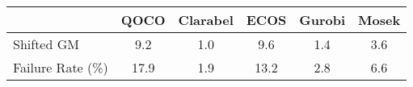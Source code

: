 \begin{tabular}{lccccc}
  \hline
   & \textbf{QOCO} & \textbf{Clarabel} & \textbf{ECOS} & \textbf{Gurobi} & \textbf{Mosek} \\ \hline
  Shifted GM & 9.2 & 1.0 & 9.6 & 1.4 & 3.6 \\ 
  Failure Rate (\%) & 17.9 & 1.9 & 13.2 & 2.8 & 6.6 \\ \hline 
\end{tabular}
